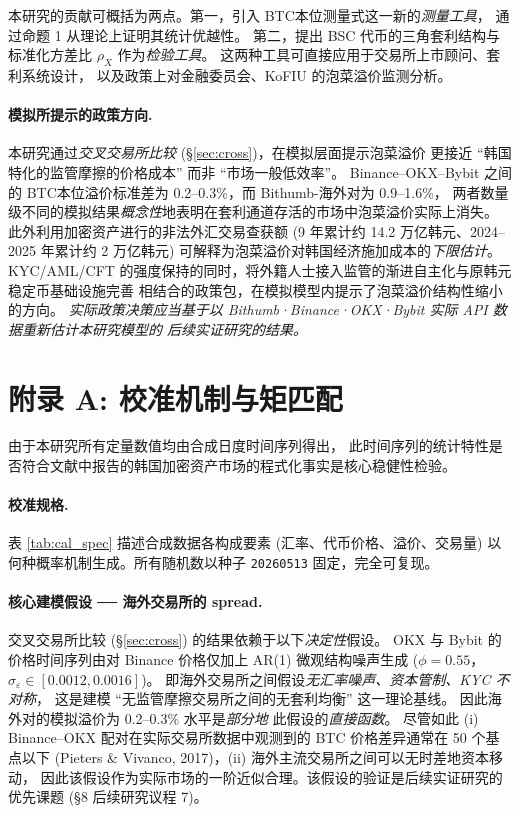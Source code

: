 \documentclass[11pt,a4paper]{article}
\begin{document}
本研究的贡献可概括为两点。第一，引入 BTC本位测量式这一新的\emph{测量工具}，
通过命题 1 从理论上证明其统计优越性。
第二，提出 BSC 代币的三角套利结构与标准化方差比 $\rho_X$ 作为\emph{检验工具}。
这两种工具可直接应用于交易所上市顾问、套利系统设计，
以及政策上对金融委员会、KoFIU 的泡菜溢价监测分析。

\paragraph{模拟所提示的政策方向.}
本研究通过\emph{交叉交易所比较} (\S\ref{sec:cross})，在模拟层面提示泡菜溢价
更接近 ``韩国特化的监管摩擦的价格成本'' 而非 ``市场一般低效率''。
Binance--OKX--Bybit 之间的 BTC本位溢价标准差为 0.2--0.3\%，而 Bithumb-海外对为 0.9--1.6\%，
两者数量级不同的模拟结果\emph{概念性}地表明在套利通道存活的市场中泡菜溢价实际上消失。
此外利用加密资产进行的非法外汇交易查获额 (9 年累计约 14.2 万亿韩元、2024--2025 年累计约 2 万亿韩元) 
可解释为泡菜溢价对韩国经济施加成本的\emph{下限估计}。
KYC/AML/CFT 的强度保持的同时，将外籍人士接入监管的渐进自主化与原韩元稳定币基础设施完善
相结合的政策包，在模拟模型内提示了泡菜溢价结构性缩小的方向。
\emph{实际政策决策应当基于以 Bithumb·Binance·OKX·Bybit 实际 API 数据重新估计本研究模型的
后续实证研究的结果。}

\appendix
\section{附录 A: 校准机制与矩匹配}
\label{app:calibration}

由于本研究所有定量数值均由合成日度时间序列得出，
此时间序列的统计特性是否符合文献中报告的韩国加密资产市场的程式化事实是核心稳健性检验。

\paragraph{校准规格.}
表 \ref{tab:cal_spec} 描述合成数据各构成要素 (汇率、代币价格、溢价、交易量)
以何种概率机制生成。所有随机数以种子 \texttt{20260513} 固定，完全可复现。

\begin{table}[H]
\centering
\caption{合成数据生成机制 (摘要)。}
\label{tab:cal_spec}
\small

\end{table}

\paragraph{核心建模假设 ── 海外交易所的 spread.}
交叉交易所比较 (\S\ref{sec:cross}) 的结果依赖于以下\emph{决定性}假设。
OKX 与 Bybit 的价格时间序列由对 Binance 价格仅加上 AR(1) 微观结构噪声生成
($\phi=0.55$，$\sigma_{\varepsilon}\in[0.0012, 0.0016]$)。
即海外交易所之间假设\emph{无汇率噪声、资本管制、KYC 不对称}，
这是建模 ``无监管摩擦交易所之间的无套利均衡'' 这一理论基线。
因此海外对的模拟溢价为 0.2--0.3\% 水平是\emph{部分地} 此假设的\emph{直接函数}。
尽管如此 (i) Binance--OKX 配对在实际交易所数据中观测到的 BTC 价格差异通常在 50 个基点以下
(Pieters \& Vivanco, 2017)，(ii) 海外主流交易所之间可以无时差地资本移动，
因此该假设作为实际市场的一阶近似合理。该假设的验证是后续实证研究的优先课题
(\S 8 后续研究议程 7)。
\end{document}
